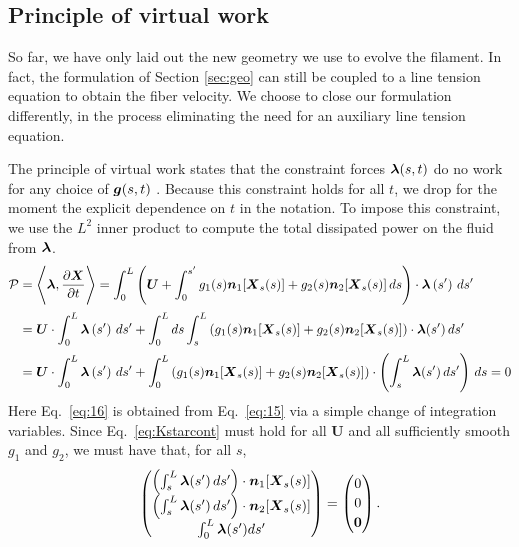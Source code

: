 \subsection{Principle of virtual work}
So far, we have only laid out the new geometry we use to evolve the filament. In fact, the formulation of Section \ref{sec:geo} can still be coupled to a line tension equation to obtain the fiber velocity. We choose to close our formulation differently, in the process eliminating the need for an auxiliary line tension equation. 

The principle of virtual work states that the constraint forces $\boldsymbol{\lambda}(s,t)$ do no work for any choice of $\boldsymbol{g}(s,t)$ \cite{varibook}. Because this constraint holds for all $t$, we drop for the moment the explicit dependence on $t$ in the notation. To impose this constraint, we use the $L^2$ inner product to compute the total dissipated power on the fluid from $\boldsymbol{\lambda}$. 
\begin{align}
\label{eq:15}
\mathcal{P}& =\Bigg{\langle} \boldsymbol{\lambda},\frac{\partial \boldsymbol{X}}{\partial t} \Bigg{\rangle} = \int_0^L \left(\boldsymbol{U}+\int_0^{s'} g_1(s) \boldsymbol{n}_1[\boldsymbol{X}_s(s)] + g_2(s)\boldsymbol{n}_2[\boldsymbol{X}_s(s)] \,ds\right) \cdot \boldsymbol{\lambda}\left(s'\right) \, ds'\\[2 pt] 
\label{eq:16}
& = \boldsymbol{U} \cdot \int_0^L \boldsymbol{\lambda}\left(s'\right) \, ds' +\int _0^L ds \int_{s}^L \left(g_1(s)\boldsymbol{n}_1[\boldsymbol{X}_s(s)] + g_2(s) \boldsymbol{n}_2[\boldsymbol{X}_s(s)] \right) \cdot \boldsymbol{\lambda}(s') \, ds'\\[2 pt]
\label{eq:Kstarcont}
& = \boldsymbol{U} \cdot \int_0^L \boldsymbol{\lambda}\left(s'\right) \, ds' + \int_0^L \left(g_1(s)\boldsymbol{n}_1[\boldsymbol{X}_s(s)] + g_2(s) \boldsymbol{n}_2[\boldsymbol{X}_s(s)] \right) \cdot  \left(\int_{s}^L  \boldsymbol{\lambda}(s') \, ds'\right) \, ds=0 
\end{align}
Here Eq.\ \eqref{eq:16} is obtained from Eq.\ \eqref{eq:15} via a simple change of integration variables. Since Eq.\ \eqref{eq:Kstarcont} must hold for all $\bm{U}$ and all sufficiently smooth $g_1$ and $g_2$, we must have that, for all $s$, 
\begin{equation}
\label{eq:noworkcont}
\begin{pmatrix} \left(\int_s^L \boldsymbol{\lambda}(s')\, ds'\right) \cdot \boldsymbol{n}_1[\boldsymbol{X}_s(s)]\\[2 pt] \left(\int_s^L \boldsymbol{\lambda}(s')\, ds'\right) \cdot\boldsymbol{n}_2[\boldsymbol{X}_s(s)]\\[2 pt] \int_0^L \boldsymbol{\lambda}(s') ds' \end{pmatrix} = \begin{pmatrix} 0 \\[2 pt] 0\\[2 pt] \boldsymbol{0}\end{pmatrix}. 
\end{equation}
